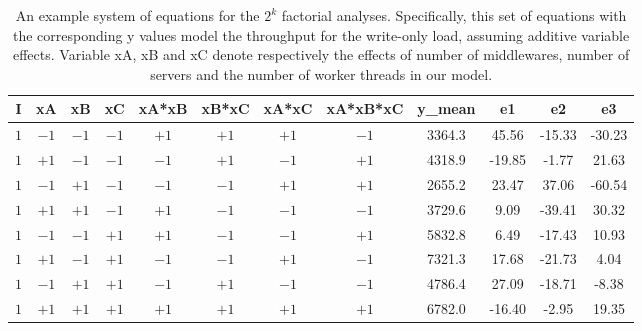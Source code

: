 \documentclass[11pt,a4paper]{article}
\begin{document}
\begin{table}[h]
\centering
\begin{tabular}{|c|c|c|c|c|c|c|c|c|c|c|c|}
\hline
I & xA & xB & xC & {\small xA*xB} & {\small xB*xC} & {\small xA*xC} & {\small xA*xB*xC} & y\_mean & e1 & e2 & e3 \\ 
\hline
$1$ & $-1$ & $-1$ & $-1$ & $+1$ & $+1$ & $+1$ & $-1$ & 3364.3 & 45.56 & -15.33 & -30.23 \\
\hline
$1$ & $+1$ & $-1$ & $-1$ & $-1$ & $+1$ & $-1$ & $+1$ & 4318.9 & -19.85 & -1.77 & 21.63 \\
\hline
$1$ & $-1$ & $+1$ & $-1$ & $-1$ & $-1$ & $+1$ & $+1$ & 2655.2 & 23.47 & 37.06 & -60.54 \\
\hline
$1$ & $+1$ & $+1$ & $-1$ & $+1$ & $-1$ & $-1$ & $-1$ & 3729.6 & 9.09 & -39.41 & 30.32 \\
\hline
$1$ & $-1$ & $-1$ & $+1$ & $+1$ & $-1$ & $-1$ & $+1$ & 5832.8 & 6.49 & -17.43 & 10.93 \\
\hline
$1$ & $+1$ & $-1$ & $+1$ & $-1$ & $-1$ & $+1$ & $-1$ & 7321.3 & 17.68 & -21.73 & 4.04 \\
\hline
$1$ & $-1$ & $+1$ & $+1$ & $-1$ & $+1$ & $-1$ & $-1$ & 4786.4 & 27.09 & -18.71 & -8.38 \\
\hline
$1$ & $+1$ & $+1$ & $+1$ & $+1$ & $+1$ & $+1$ & $+1$ & 6782.0 & -16.40 & -2.95 & 19.35 \\
\hline
\end{tabular}
\caption{An example system of equations for the $2^{k}$ factorial analyses. Specifically, this set of equations with the corresponding y values model the throughput for the write-only load, assuming additive variable effects. Variable xA, xB and xC denote respectively the effects of number of middlewares, number of servers and the number of worker threads in our model.} \label{tab:2k-example-table}
\end{table}

  
\end{document}
